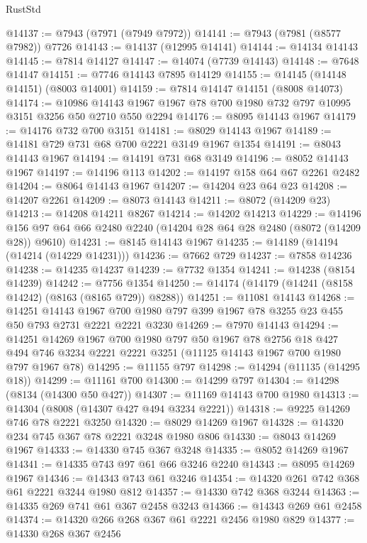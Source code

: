 \begin{lexlean}{RustStd}
\begin{coremodule}
@14137 := @7943 (@7971 (@7949 @7972))
@14141 := @7943 (@7981 (@8577 @7982)) @7726
@14143 := @14137 (@12995 @14141)
@14144 := @14134 @14143
@14145 := @7814 @14127
@14147 := @14074 (@7739 @14143)
@14148 := @7648 @14147
@14151 := @7746 @14143 @7895 @14129
@14155 := @14145 (@14148 @14151) (@8003 @14001)
@14159 := @7814 @14147 @14151 (@8008 @14073)
@14174 := @10986 @14143 @1967 @1967 @78 @700 @1980 @732 @797 @10995 @3151 @3256 @50 @2710 @550 @2294
@14176 := @8095 @14143 @1967
@14179 := @14176 @732 @700 @3151
@14181 := @8029 @14143 @1967
@14189 := @14181 @729 @731 @68 @700 @2221 @3149 @1967 @1354
@14191 := @8043 @14143 @1967
@14194 := @14191 @731 @68 @3149
@14196 := @8052 @14143 @1967
@14197 := @14196 @113
@14202 := @14197 @158 @64 @67 @2261 @2482
@14204 := @8064 @14143 @1967
@14207 := @14204 @23 @64 @23
@14208 := @14207 @2261
@14209 := @8073 @14143
@14211 := @8072 (@14209 @23)
@14213 := @14208 @14211 @8267
@14214 := @14202 @14213
@14229 := @14196 @156 @97 @64 @66 @2480 @2240 (@14204 @28 @64 @28 @2480 (@8072 (@14209 @28)) @9610)
@14231 := @8145 @14143 @1967
@14235 := @14189 (@14194 (@14214 (@14229 @14231)))
@14236 := @7662 @729
@14237 := @7858 @14236
@14238 := @14235 @14237
@14239 := @7732 @1354
@14241 := @14238 (@8154 @14239)
@14242 := @7756 @1354
@14250 := @14174 (@14179 (@14241 (@8158 @14242) (@8163 (@8165 @729)) @8288))
@14251 := @11081 @14143
@14268 := @14251
    @14143
    @1967
    @700
    @1980
    @797
    @399
    @1967
    @78
    @3255
    @23
    @455
    @50
    @793
    @2731
    @2221
    @2221
    @3230
@14269 := @7970 @14143
@14294 := @14251
    @14269
    @1967
    @700
    @1980
    @797
    @50
    @1967
    @78
    @2756
    @18
    @427
    @494
    @746
    @3234
    @2221
    @2221
    @3251
    (@11125 @14143 @1967 @700 @1980 @797 @1967 @78)
@14295 := @11155 @797
@14298 := @14294 (@11135 (@14295 @18))
@14299 := @11161 @700
@14300 := @14299 @797
@14304 := @14298 (@8134 (@14300 @50 @427))
@14307 := @11169 @14143 @700 @1980
@14313 := @14304 (@8008 (@14307 @427 @494 @3234 @2221))
@14318 := @9225 @14269 @746 @78 @2221 @3250
@14320 := @8029 @14269 @1967
@14328 := @14320 @234 @745 @367 @78 @2221 @3248 @1980 @806
@14330 := @8043 @14269 @1967
@14333 := @14330 @745 @367 @3248
@14335 := @8052 @14269 @1967
@14341 := @14335 @743 @97 @61 @66 @3246 @2240
@14343 := @8095 @14269 @1967
@14346 := @14343 @743 @61 @3246
@14354 := @14320 @261 @742 @368 @61 @2221 @3244 @1980 @812
@14357 := @14330 @742 @368 @3244
@14363 := @14335 @269 @741 @61 @367 @2458 @3243
@14366 := @14343 @269 @61 @2458
@14374 := @14320 @266 @268 @367 @61 @2221 @2456 @1980 @829
@14377 := @14330 @268 @367 @2456

\end{coremodule}
\end{lexlean}
